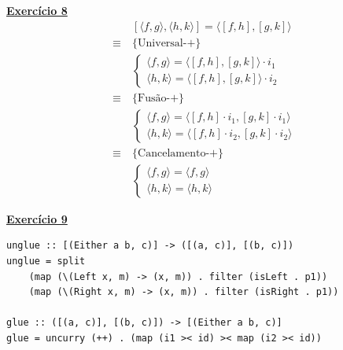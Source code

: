 \documentclass[a4paper,11pt]{article}
\begin{document}
	\noindent \underline{\textbf{Exercício 8}}\\
	\[
	\begin{aligned}
		&[\langle f, g \rangle, \langle h, k \rangle] = \langle [f, h], [g, k] \rangle \\
		\equiv \  &\{\text{Universal-+}\}\\
		&\begin{cases}
			\langle f, g \rangle = \langle [f, h], [g, k] \rangle \cdot i_1 \\
			\langle h, k \rangle = \langle [f, h], [g, k] \rangle \cdot i_2
		\end{cases}\\
		\equiv \  &\{\text{Fusão-+}\}\\
		&\begin{cases}
			\langle f, g \rangle = \langle [f, h] \cdot i_1, [g, k] \cdot i_1 \rangle \\
			\langle h, k \rangle = \langle [f, h] \cdot i_2, [g, k] \cdot i_2 \rangle
		\end{cases}\\
		\equiv \  &\{\text{Cancelamento-+}\}\\
		&\begin{cases}
			\langle f, g \rangle = \langle f, g \rangle \\
			\langle h, k \rangle = \langle h, k \rangle
		\end{cases}
	\end{aligned}
	\]
	
	\newpage
	
	\noindent \underline{\textbf{Exercício 9}}
\begin{verbatim}
unglue :: [(Either a b, c)] -> ([(a, c)], [(b, c)])
unglue = split 
	(map (\(Left x, m) -> (x, m)) . filter (isLeft . p1))
	(map (\(Right x, m) -> (x, m)) . filter (isRight . p1))

glue :: ([(a, c)], [(b, c)]) -> [(Either a b, c)]
glue = uncurry (++) . (map (i1 >< id) >< map (i2 >< id))	
\end{verbatim}
	
\end{document}
